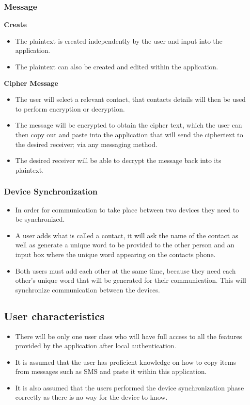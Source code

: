 \subsubsection{Message}
\textbf{Create}
\begin{itemize}
\item The plaintext is created independently by the user and input into the application.
\item The plaintext can also be created and edited within the application.
\end{itemize}
\textbf{Cipher Message}
\begin{itemize}
\item The user will select a relevant contact, that contacts details will then be used to perform encryption or decryption.
\item The message will be encrypted to obtain the cipher text, which the user can then copy out and paste into the application that will send the ciphertext to the desired receiver; via any messaging method.
\item The desired receiver will be able to decrypt the message back into its plaintext.
\end{itemize}

\subsubsection{Device Synchronization}
\begin{itemize}
\item In order for communication to take place between two devices they need to be synchronized.
\item A user adds what is called a contact, it will ask the name of the contact as well as generate a unique word to be provided to the other person and an input box where the unique word appearing on the contacts phone.
\item Both users must add each other at the same time, because they need each other's unique word that will be generated for their communication. This will synchronize communication between the devices.
\end{itemize}

\subsection{User characteristics}
\begin{itemize}
\item There will be only one user class who will have full access to all the features provided by the application after local authentication.
\item It is assumed that the user has proficient knowledge on how to copy items from messages such as SMS and paste it within this application.
\item It is also assumed that the users performed the device synchronization phase correctly as there is no way for the device to know.
\end{itemize}


